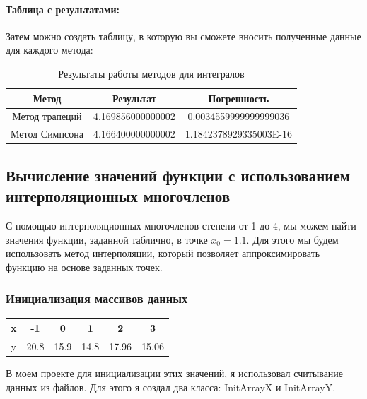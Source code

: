 \documentclass[12pt]{article}
\begin{document}
    \paragraph{Таблица с результатами:}
    Затем можно создать таблицу, в которую вы сможете вносить полученные данные для каждого метода:

    \begin{table}[ht]
        \centering
        \begin{tabular}{|c|c|c|}
            \hline
            \textbf{Метод} & \textbf{Результат} & \textbf{Погрешность} \\
            \hline
            Метод трапеций & 4.169856000000002 & 0.0034559999999999036 \\
            \hline
            Метод Симпсона & 4.166400000000002 & 1.1842378929335003E-16 \\
            \hline
        \end{tabular}
        \caption{Результаты работы методов для интегралов}
    \end{table}

    \subsection{Вычисление значений функции с использованием интерполяционных многочленов}


    С помощью интерполяционных многочленов степени от 1 до 4, мы можем найти значения функции, заданной таблично, в точке $x_0 = 1.1$. Для этого мы будем использовать метод интерполяции, который позволяет аппроксимировать функцию на основе заданных точек.

    \subsubsection{Инициализация массивов данных}

    \begin{center}
        \begin{tabular}{|c|c|c|c|c|c|}
            \hline
            x & -1   & 0     & 1    & 2     & 3     \\
            \hline
            y & 20.8 & 15.9  & 14.8 & 17.96 & 15.06 \\
            \hline
        \end{tabular}
    \end{center}

    В моем проекте для инициализации этих значений, я использовал считывание данных из файлов. Для этого я создал два класса: InitArrayX и InitArrayY.
\end{document}
